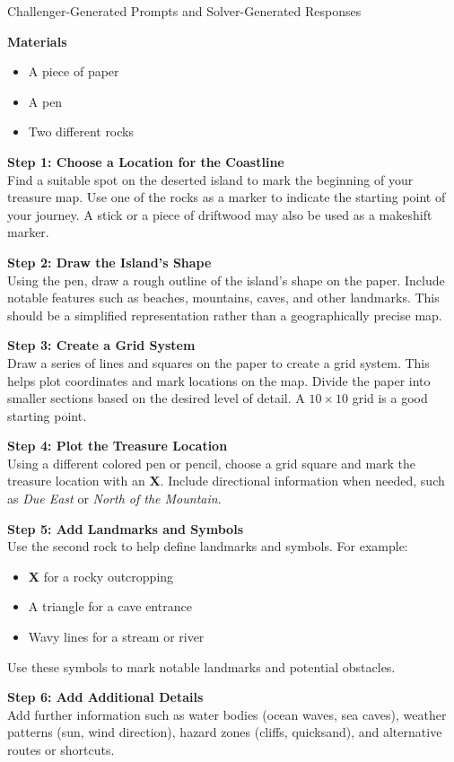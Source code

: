 \documentclass[]{fairmeta}
\begin{document}
\begin{darkbluebox}{Challenger-Generated Prompts and Solver-Generated Responses}
{{\textbf{Materials}
\begin{itemize}\setlength\itemsep{0pt}
\item A piece of paper
\item A pen
\item Two different rocks
\end{itemize}

\textbf{Step 1: Choose a Location for the Coastline} \\
Find a suitable spot on the deserted island to mark the beginning of your treasure map. Use one of the rocks as a marker to indicate the starting point of your journey. A stick or a piece of driftwood may also be used as a makeshift marker.

\textbf{Step 2: Draw the Island's Shape} \\
Using the pen, draw a rough outline of the island's shape on the paper. Include notable features such as beaches, mountains, caves, and other landmarks. This should be a simplified representation rather than a geographically precise map.

\textbf{Step 3: Create a Grid System} \\
Draw a series of lines and squares on the paper to create a grid system. This helps plot coordinates and mark locations on the map. Divide the paper into smaller sections based on the desired level of detail. A $10 \times 10$ grid is a good starting point.

\textbf{Step 4: Plot the Treasure Location} \\
Using a different colored pen or pencil, choose a grid square and mark the treasure location with an \textbf{X}. Include directional information when needed, such as \emph{Due East} or \emph{North of the Mountain}.

\textbf{Step 5: Add Landmarks and Symbols} \\
Use the second rock to help define landmarks and symbols. For example:
\begin{itemize}\setlength\itemsep{0pt}
\item \textbf{X} for a rocky outcropping
\item A triangle for a cave entrance
\item Wavy lines for a stream or river
\end{itemize}
Use these symbols to mark notable landmarks and potential obstacles.

\textbf{Step 6: Add Additional Details} \\
Add further information such as water bodies (ocean waves, sea caves), weather patterns (sun, wind direction), hazard zones (cliffs, quicksand), and alternative routes or shortcuts.

}}
\end{darkbluebox}
\end{document}
